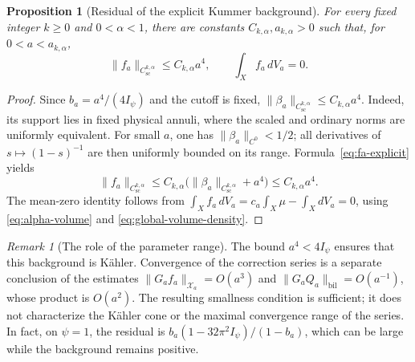 \documentclass[11pt,a4paper,twoside]{article}
\numberwithin{equation}{section}
\newtheorem{proposition}[theorem]{Proposition}
\theoremstyle{definition}
\theoremstyle{remark}
\newtheorem{remark}[theorem]{Remark}
\begin{document}
\begin{proposition}[Residual of the explicit Kummer background]
\label{prop:model-residual}
For every fixed integer \(k\ge0\) and \(0<\alpha<1\), there
are constants \(C_{k,\alpha},a_{k,\alpha}>0\) such that, for
\(0<a<a_{k,\alpha}\),
\begin{equation}\label{eq:fa-bound}
\|f_a\|_{C_{\mathrm{sc}}^{k,\alpha}}\le C_{k,\alpha}a^4,
\qquad \int_Xf_a\,dV_a=0.
\end{equation}
\end{proposition}
\begin{proof}
Since \(b_a=a^4/(4I_\psi)\) and the cutoff is fixed,
\(\|\beta_a\|_{C_{\mathrm{sc}}^{k,\alpha}}\le C_{k,\alpha}a^4\).
Indeed, its support lies in fixed physical annuli, where the
scaled and ordinary norms are uniformly equivalent. For small
\(a\), one has \(\|\beta_a\|_{C^0}<1/2\); all derivatives
of \(s\mapsto(1-s)^{-1}\) are then uniformly bounded on its
range. Formula~\eqref{eq:fa-explicit} yields
\[
\|f_a\|_{C_{\mathrm{sc}}^{k,\alpha}}
\le C_{k,\alpha}\bigl(\|\beta_a\|_{C_{\mathrm{sc}}^{k,\alpha}}
+a^4\bigr)\le C_{k,\alpha}a^4.
\]
The mean-zero identity follows from
\(\int_Xf_a\,dV_a=c_a\int_X\mu-\int_XdV_a=0\), using
\eqref{eq:alpha-volume} and \eqref{eq:global-volume-density}.
\end{proof}

\begin{remark}[The role of the parameter range]
\label{rem:a4-sufficient}
The bound \(a^4<4I_\psi\) ensures that this background is
K\"ahler. Convergence of the correction series is a separate
conclusion of the estimates
\(\|G_af_a\|_{\mathcal X_a}=O(a^3)\) and
\(\|G_aQ_a\|_{\mathrm{bil}}=O(a^{-1})\), whose product is
\(O(a^2)\). The resulting smallness condition is sufficient;
it does not characterize the K\"ahler cone or the maximal
convergence range of the series. In fact, on \(\psi=1\),
the residual is \(b_a(1-32\pi^2I_\psi)/(1-b_a)\), which
can be large while the background remains positive.
\end{remark}
\end{document}
